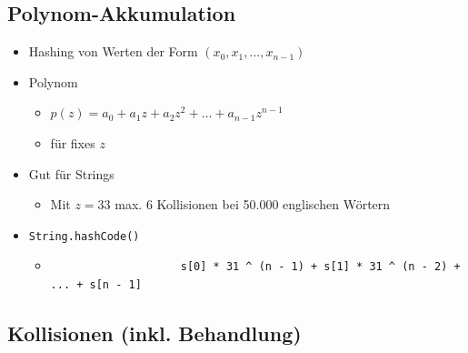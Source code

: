\documentclass[a4paper, landscape, 8pt]{scrartcl}
\begin{document}
\begin{multicols*}{4}
            \subsection{Polynom-Akkumulation}
                \begin{itemize}
                    \item Hashing von Werten der Form $(x_0, x_1, \dots, x_{n-1})$
                    \item Polynom
                    \begin{itemize}
                        \item $p(z) = a_0 + a_1 z + a_2 z^2 + \dots + a_{n-1} z^{n-1}$
                        \item für fixes $z$
                    \end{itemize}
                    \item Gut für Strings
                    \begin{itemize}
                        \item Mit $z = 33$ max. 6 Kollisionen bei 50.000 englischen Wörtern
                    \end{itemize}
                    \item \texttt{String.hashCode()}
                    \begin{itemize}
                        \item \begin{lstlisting}
                    s[0] * 31 ^ (n - 1) + s[1] * 31 ^ (n - 2) + ... + s[n - 1]
                        \end{lstlisting}
                    \end{itemize}
                \end{itemize}

            \subsection{Kollisionen (inkl. Behandlung)}

\end{multicols*}
\end{document}
